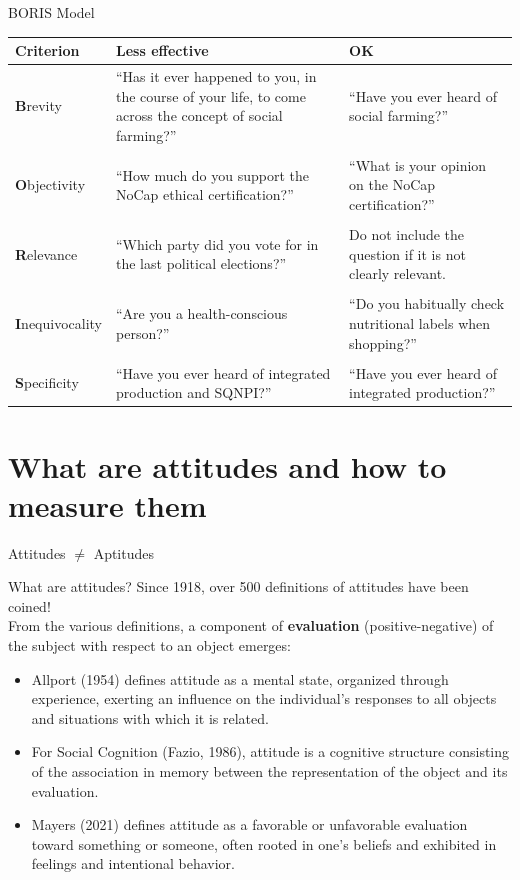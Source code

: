\documentclass{beamer}
\begin{document}
\begin{frame}{BORIS Model}
  \scriptsize
  \centering
  \begin{tabular}{lp{4cm}p{3.5cm}}
    \toprule
    \textbf{Criterion} & \textbf{Less effective} & \textbf{OK} \\
    \midrule
    \textbf{B}revity & “Has it ever happened to you, in the course of your life, to come across the concept of social farming?” & “Have you ever heard of social farming?” \\
    \\
    \textbf{O}bjectivity & “How much do you support the NoCap ethical certification?” & “What is your opinion on the NoCap certification?” \\
    \\
    \textbf{R}elevance & “Which party did you vote for in the last political elections?” & Do not include the question if it is not clearly relevant. \\
    \\
    \textbf{I}nequivocality & “Are you a health-conscious person?” & “Do you habitually check nutritional labels when shopping?” \\
    \\
    \textbf{S}pecificity & “Have you ever heard of integrated production and SQNPI?” & “Have you ever heard of integrated production?” \\
    \bottomrule
  \end{tabular}
\end{frame}

\section{What are attitudes and how to measure them}
\begin{frame}{Attitudes $\neq$ Aptitudes}
    \begin{block}{What are attitudes?}
        Since 1918, over 500 definitions of attitudes have been coined! \\
        From the various definitions, a component of \textbf{evaluation} (positive-negative) of the subject with respect to an object emerges: \\
        \pause
        \small
    \begin{itemize}
        \item Allport (1954) defines attitude as a mental state, organized through experience, exerting an influence on the individual's responses to all objects and situations with which it is related.
        \item For Social Cognition (Fazio, 1986), attitude is a cognitive structure consisting of the association in memory between the representation of the object and its evaluation.
        \item Mayers (2021) defines attitude as a favorable or unfavorable evaluation toward something or someone, often rooted in one's beliefs and exhibited in feelings and intentional behavior.
    \end{itemize}
    \end{block}
\end{frame}
\end{document}
